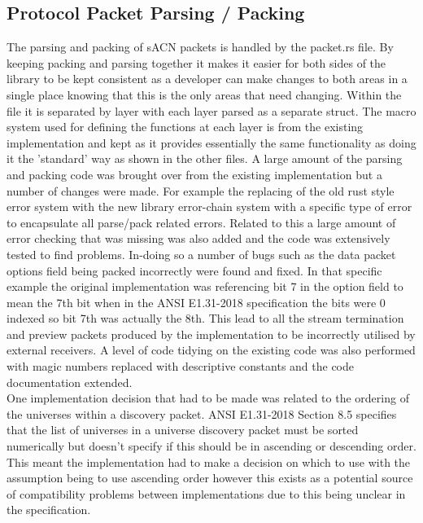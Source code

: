 \documentclass[11pt,a4paper]{article}
\begin{document}
\subsection{Protocol Packet Parsing / Packing}
The parsing and packing of sACN packets is handled by the packet.rs file. By keeping packing and parsing together it makes it easier for both sides of the library to be kept consistent as a developer can make changes to both areas in a single place knowing that this is the only areas that need changing. Within the file it is separated by layer with each layer parsed as a separate struct. The macro system used for defining the functions at each layer is from the existing implementation and kept as it provides essentially the same functionality as doing it the 'standard' way as shown in the other files. A large amount of the parsing and packing code was brought over from the existing implementation but a number of changes were made. For example the replacing of the old rust style error system with the new library error-chain system with a specific type of error to encapsulate all parse/pack related errors. Related to this a large amount of error checking that was missing was also added and the code was extensively tested to find problems. In-doing so a number of bugs such as the data packet options field being packed incorrectly were found and fixed. In that specific example the original implementation was referencing bit 7 in the option field to mean the 7th bit when in the ANSI E1.31-2018 specification the bits were 0 indexed so bit 7th was actually the 8th. This lead to all the stream termination and preview packets produced by the implementation to be incorrectly utilised by external receivers. A level of code tidying on the existing code was also performed with magic numbers replaced with descriptive constants and the code documentation extended.\\

One implementation decision that had to be made was related to the ordering of the universes within a discovery packet. ANSI E1.31-2018 Section 8.5 specifies that the list of universes in a universe discovery packet must be sorted numerically but doesn't specify if this should be in ascending or descending order. This meant the implementation had to make a decision on which to use with the assumption being to use ascending order however this exists as a potential source of compatibility problems between implementations due to this being unclear in the specification.
\end{document}
